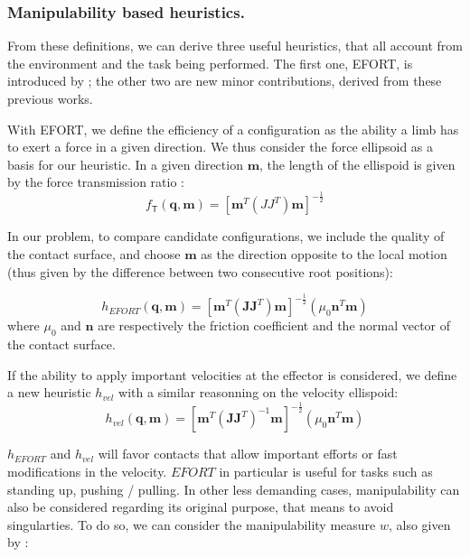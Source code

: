 \subsubsection{Manipulability based heuristics.}
From these definitions, we can derive three useful heuristics, that all account from the environment and the task being performed.
The first one, EFORT, is introduced by \cite{Tonneau2014}; the other two are new minor contributions, derived from these previous works.

With EFORT, we define the efficiency of a configuration as the ability a limb has to exert a force in a given direction.
We thus consider the force ellipsoid as a basis for our heuristic.
In a given direction $\mathbf{m}$, the length of the ellispoid is given by the force transmission ratio \citep{1087795}:
\begin{equation*}
f_\mathsf{T}(\mathbf{q}, \mathbf{m}) = [\mathbf{m}^{T}(JJ^{T})\mathbf{m}]^{-\frac{1}{2}}
\end{equation*}

In our problem, to compare candidate configurations, we include the quality of the contact surface, and choose $\mathbf{m}$ as the direction
opposite to the local motion (thus given by the difference between two consecutive root positions):

\begin{equation}
h_{EFORT}(\mathbf{q}, \mathbf{m}) = [\mathbf{m}^{T}(\mathbf{J}\mathbf{J}^T)\mathbf{m}]^{-\frac{1}{2}} ( \mu_0 \mathbf{n}^T \mathbf{m})
\end{equation}
where $\mu_0$ and $\mathbf{n}$ are respectively the friction coefficient and the normal vector of the contact surface.


If the ability to apply important velocities at the effector is considered, we define a new heuristic $h_{vel}$ with a similar reasonning on the velocity ellispoid:
\begin{equation}
h_{vel}(\mathbf{q}, \mathbf{m}) = [\mathbf{m}^{T}(\mathbf{J}\mathbf{J}^T)^{-1}\mathbf{m}]^{-\frac{1}{2}} ( \mu_0 \mathbf{n}^T \mathbf{m})
\end{equation}

$h_{EFORT}$ and $h_{vel}$ will favor contacts that allow important efforts or fast modifications in the velocity.
$EFORT$ in particular is useful for tasks such as standing up, pushing / pulling.
In other less demanding cases, manipulability can also be considered regarding its original purpose, that means to avoid singularties.
To do so, we can consider the manipulability measure $w$, also given by \citeauthor{Yoshikawa1984}:

